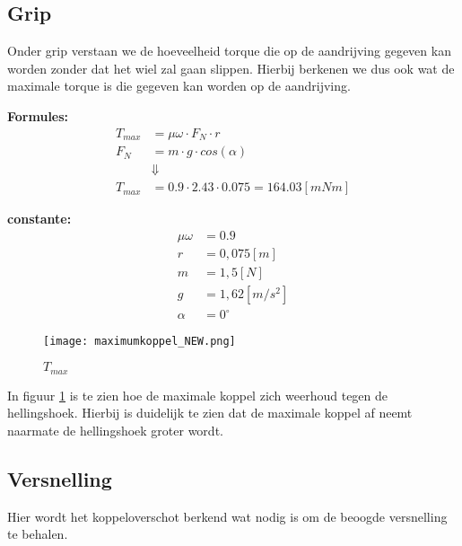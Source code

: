 \subsection{Grip}
    Onder grip verstaan we de hoeveelheid torque die op de aandrijving gegeven kan worden zonder dat het wiel zal gaan slippen. Hierbij berkenen we dus ook wat de maximale torque is die gegeven kan worden op de aandrijving.

    \begin{multicols}{2}
        \textbf{Formules:}
        \begin{equation}
            \begin{split}
                T_{max} &= \mu \omega \cdot F_{N} \cdot r \\
                F_{N} &= m \cdot g \cdot cos(\alpha) \\
                &\Downarrow \\
                T_{max} &= 0.9 \cdot 2.43 \cdot 0.075 = 164.03 [mNm]
            \end{split}
        \end{equation}

        \textbf{constante:}
        \begin{equation*}
            \begin{split}
                \mu \omega &= 0.9 \\
                r &= 0,075 [m] \\
                m &= 1,5 [N] \\
                g &= 1,62 [m/s^2] \\
                \alpha &= 0^\circ 
            \end{split}
        \end{equation*}
    \end{multicols}

    \begin{figure}[H]
        \centering
        \texttt{[image: maximumkoppel\_NEW.png]}
        \caption{$T_{max}$}
        \label{fig:peanut}
    \end{figure}

    In figuur \ref{fig:peanut} is te zien hoe de maximale koppel zich weerhoud tegen de hellingshoek. Hierbij is duidelijk te zien dat de maximale koppel af neemt naarmate de hellingshoek groter wordt.

\subsection{Versnelling}
    Hier wordt het koppeloverschot berkend wat nodig is om de beoogde versnelling te behalen. 

